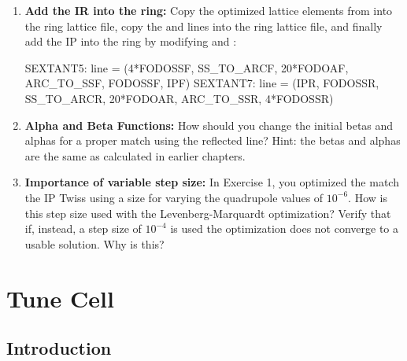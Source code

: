 \documentclass{hitec}     %
\begin{document}
{\begin{enumerate}[leftmargin=*]
\begin{code}
! Call the quadrupole settings in IPF.out and IPR.out
call, file = "IPF.out"
call, file = "IPR.out"
\end{code}
This should give a very good match, however to ensure a perfect solution, the full line to the periodic solution is matched once more. Using the full IR line () now, vary the downstream quadrupoles , , , and  to match perfectly to the periodic betas in the straight section at the end of the line. Now you can use  with the fully optimized IR quadrupole settings
%
\item {\bf Add the IR into the ring:} Copy the optimized lattice elements from  into the ring lattice file, copy the  and  lines into the ring lattice file, and finally add the IP into the ring by modifying  and :
\begin{code}
SEXTANT5: line = (4*FODOSSF, SS_TO_ARCF, 20*FODOAF, ARC_TO_SSF, FODOSSF, IPF)
SEXTANT7: line = (IPR, FODOSSR, SS_TO_ARCR, 20*FODOAR, ARC_TO_SSR, 4*FODOSSR)
\end{code}
%
\item \textbf{Alpha and Beta Functions:} How should you change the initial betas and alphas for a proper match using the reflected line?
Hint: the betas and alphas are the same as calculated in earlier chapters.
%
\item \textbf{Importance of variable step size:}
In Exercise 1, you optimized the match the IP Twiss using a 
 size for varying the quadrupole  values of $10^{-6}$.
How is this step size used with the Levenberg-Marquardt optimization?
Verify that if, instead, a step size of $10^{-4}$ is used the optimization does not
converge to a usable solution. Why is this?
%
\end{enumerate}

\newpage

\section{Tune Cell}

\subsection{Introduction}

}
\end{document}
